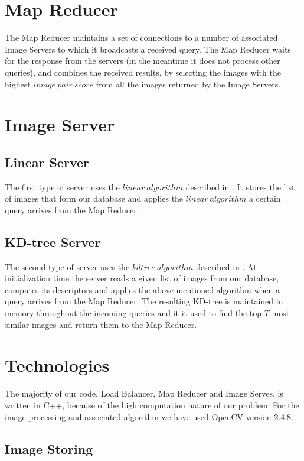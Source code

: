 \section{Map Reducer}

The Map Reducer maintains a set of connections to a number of associated Image Servers to which it broadcasts a received query. The Map Reducer waits for the response from the servers (in the meantime it does not process other queries), and combines the received results, by selecting the images with the highest $image\ pair\ score$ from all the images returned by the Image Servers.

\section{Image Server}

\subsection{Linear Server}
	The first type of server uses the $linear\ algorithm$ described in . It stores the list of images that form our database and applies the $linear\ algorithm$ a certain query arrives from the Map Reducer.
	
\subsection{KD-tree Server}
	The second type of server uses the $kdtree\ algorithm$ described in . At initialization time the server reads a given list of images from our database, computes its descriptors and applies the above mentioned algorithm when a query arrives from the Map Reducer. The resulting KD-tree is maintained in memory throughout the incoming queries and it it used to find the top $T$ most similar images and return them to the Map Reducer.
	
\section{Technologies}

The majority of our code, Load Balancer, Map Reducer and Image Serves, is written in C++, because of the high computation nature of our problem. For the image processing and associated algorithm we have used OpenCV version 2.4.8.

\subsection{Image Storing}

